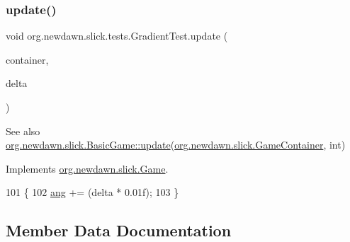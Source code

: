 \mbox{\label{classorg_1_1newdawn_1_1slick_1_1tests_1_1_gradient_test_ad4a28cd7a550a10dd69aa99b6fdad22e}} 
\subsubsection{\texorpdfstring{update()}{update()}}
{\footnotesize\ttfamily void org.\+newdawn.\+slick.\+tests.\+Gradient\+Test.\+update (\begin{DoxyParamCaption}\item[{\mbox{\hyperlink{classorg_1_1newdawn_1_1slick_1_1_game_container}{Game\+Container}}}]{container,  }\item[{int}]{delta }\end{DoxyParamCaption})\hspace{0.3cm}{\ttfamily [inline]}}

\begin{DoxySeeAlso}{See also}
\mbox{\hyperlink{classorg_1_1newdawn_1_1slick_1_1_basic_game_acfe6fa05aef83bff1631af91a3e4bd20}{org.\+newdawn.\+slick.\+Basic\+Game\+::update}}(\mbox{\hyperlink{classorg_1_1newdawn_1_1slick_1_1_game_container}{org.\+newdawn.\+slick.\+Game\+Container}}, int) 
\end{DoxySeeAlso}


Implements \mbox{\hyperlink{interfaceorg_1_1newdawn_1_1slick_1_1_game_ab07b2e9463ee4631620dde0de25bdee8}{org.\+newdawn.\+slick.\+Game}}.


\begin{DoxyCode}
101                                                            \{
102         \mbox{\hyperlink{classorg_1_1newdawn_1_1slick_1_1tests_1_1_gradient_test_ac3493f41dce0f87d86a4a83de31181a3}{ang}} += (delta * 0.01f);
103     \}
\end{DoxyCode}


\subsection{Member Data Documentation}
\mbox{\label{classorg_1_1newdawn_1_1slick_1_1tests_1_1_gradient_test_ac3493f41dce0f87d86a4a83de31181a3}} 
